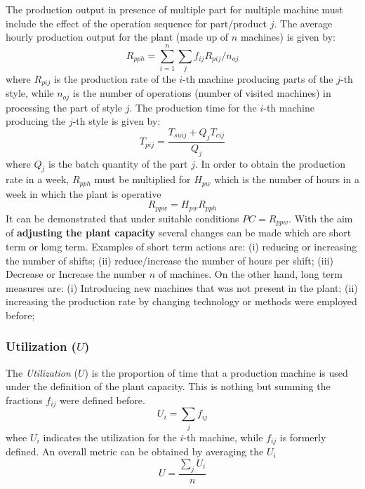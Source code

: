 The production output in presence of multiple part for multiple machine must include the effect of the operation sequence for part/product $j$. The average hourly production output for the plant (made up of $n$ machines) is given by:
\begin{equation}
    R_{pph}=\sum_{i=1}^n\sum_{j}{f_{ij}R_{pij}/n_{oj}}
\end{equation} 
where $R_{pij}$ is the production rate of the $i$-th machine producing parts of the $j$-th style, while $n_{oj}$ is the number of operations (number of visited machines) in processing the part of style $j$. The production time for the $i$-th machine producing the $j$-th style is given by: 
\begin{equation}
    T_{pij}=\frac{T_{suij}+Q_j{T_{cij}}}{Q_j}
\end{equation} 
where $Q_j$ is the batch quantity of the part $j$. In order to obtain the production rate in a week, $R_{pph}$ must be multiplied for $H_{pw}$ which is the number of hours in a week in which the plant is operative
\begin{equation}
    R_{ppw}=H_{pw}R_{pph}
\end{equation}
\noindent
It can be demonstrated that under suitable conditions $PC=R_{ppw}$. With the aim of \textbf{adjusting the plant capacity} several changes can be made which are short term or lomg term. Examples of short term actions are: (i) reducing or increasing the number of shifts; (ii) reduce/increase the number of hours per shift; (iii) Decrease or Increase the number $n$ of machines. On the other hand, long term measures are: (i) Introducing new machines that was not present in the plant; (ii) increasing the production rate by changing technology or methods were employed before;  
 
\subsubsection{Utilization ($U$)}
The \textit{Utilization} ($U$) is the proportion of time that a production machine is used under the definition of the plant capacity. This is nothing but summing the fractions $f_{ij}$ were defined before.
\begin{equation}
    U_i = \sum_{j} {f_{ij}}
\end{equation}
whee $U_i$ indicates the utilization for the $i$-th machine, while $f_{ij}$ is formerly  defined. An overall metric can be obtained by averaging the $U_i$
\begin{equation}
    U=\frac{\sum_j{U_i}}{n}
\end{equation}

